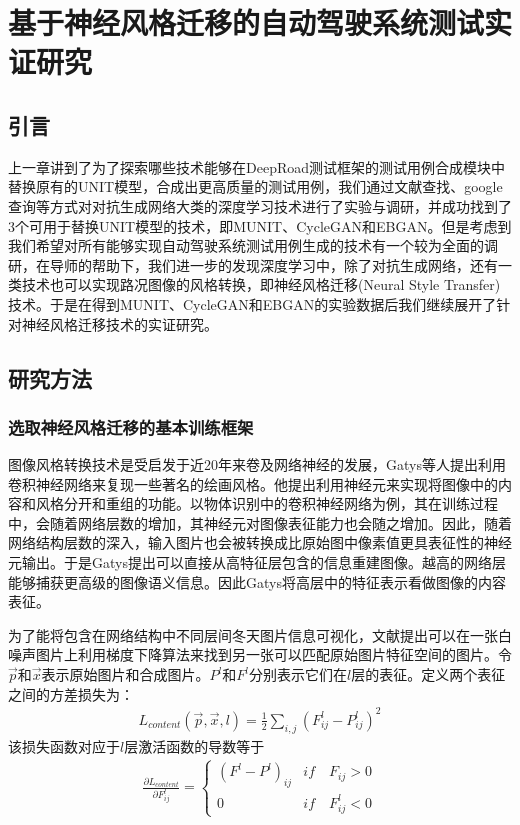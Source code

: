 \chapter{基于神经风格迁移的自动驾驶系统测试实证研究}


\section{引言}

上一章讲到了为了探索哪些技术能够在DeepRoad测试框架的测试用例合成模块中替换原有的UNIT模型，合成出更高质量的测试用例，我们通过文献查找、google查询等方式对对抗生成网络大类的深度学习技术进行了实验与调研，并成功找到了3个可用于替换UNIT模型的技术，即MUNIT\cite{MUNIT}、CycleGAN\cite{CycleGAN}和EBGAN\cite{ebgan}。但是考虑到我们希望对所有能够实现自动驾驶系统测试用例生成的技术有一个较为全面的调研，在导师的帮助下，我们进一步的发现深度学习中，除了对抗生成网络，还有一类技术也可以实现路况图像的风格转换，即神经风格迁移(Neural Style Transfer)技术。于是在得到MUNIT、CycleGAN和EBGAN的实验数据后我们继续展开了针对神经风格迁移技术的实证研究。

\section{研究方法}

\subsection{选取神经风格迁移的基本训练框架}

图像风格转换技术是受启发于近20年来卷及网络神经的发展，Gatys等人\cite{nst}提出利用卷积神经网络来复现一些著名的绘画风格。他提出利用神经元来实现将图像中的内容和风格分开和重组的功能。以物体识别中的卷积神经网络为例，其在训练过程中，会随着网络层数的增加，其神经元对图像表征能力也会随之增加。因此，随着网络结构层数的深入，输入图片也会被转换成比原始图中像素值更具表征性的神经元输出。于是Gatys提出可以直接从高特征层包含的信息重建图像。越高的网络层能够捕获更高级的图像语义信息。因此Gatys将高层中的特征表示看做图像的内容表征。

为了能将包含在网络结构中不同层间冬天图片信息可视化，文献\cite{nst}提出可以在一张白噪声图片上利用梯度下降算法来找到另一张可以匹配原始图片特征空间的图片。令$\overrightarrow{p}$和$\overrightarrow{x}$表示原始图片和合成图片。$P^l$和$F^l$分别表示它们在$l$层的表征。定义两个表征之间的方差损失为：
\begin{align}
    L_{content}(\overrightarrow{p},\overrightarrow{x},l)=\frac{1}{2}\sum_{i,j}(F_{ij}^l-P_{ij}^l)^2
\end{align}
该损失函数对应于$l$层激活函数的导数等于
\begin{align}
    \frac{\partial L_{content}}{\partial F_{ij}^l} = \begin{cases}
        (F^l-P^l)_{ij}  & if \quad F_{ij} > 0 \\
        0 & if \quad F_{ij}^l \lt 0
    \end{cases}
\end{align}

